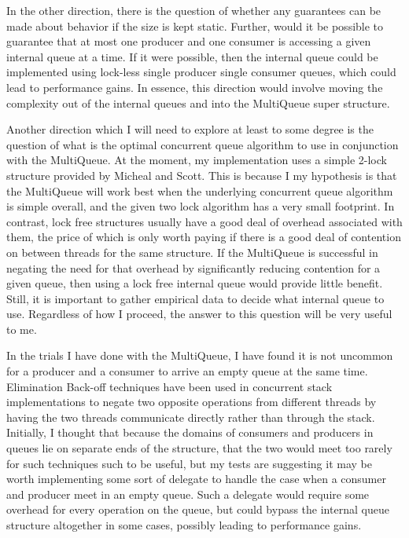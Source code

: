 \documentclass[12pt]{report}
\begin{document}
In the other direction, there is the question of whether any guarantees can be
made about behavior if the size is kept static. Further, would it be possible
to guarantee that at most one producer and one consumer is accessing a given
internal queue at a time. If it were possible, then the internal queue could be
implemented using lock-less single producer single consumer queues, which could
lead to performance gains. In essence, this direction would involve moving the
complexity out of the internal queues and into the MultiQueue super structure.

Another direction which I will need to explore at least to some degree is the
question of what is the optimal concurrent queue algorithm to use in
conjunction with the MultiQueue. At the moment, my implementation uses a simple
2-lock structure provided by Micheal and Scott\cite{michael1996}. This is
because I my hypothesis is that the MultiQueue will work best when the
underlying concurrent queue algorithm is simple overall, and the given two lock
algorithm has a very small footprint. In contrast, lock free structures usually
have a good deal of overhead associated with them, the price of which is only
worth paying if there is a good deal of contention on between threads for the
same structure. If the MultiQueue is successful in negating the need for that
overhead by significantly reducing contention for a given queue, then using a
lock free internal queue would provide little benefit. Still, it is important
to gather empirical data to decide what internal queue to use. Regardless of
how I proceed, the answer to this question will be very useful to me.

In the trials I have done with the MultiQueue, I have found it is not uncommon
for a producer and a consumer to arrive an empty queue at the same time.
Elimination Back-off techniques have been used in concurrent stack
implementations to negate two opposite operations from different threads by
having the two threads communicate directly rather than through the stack.
Initially, I thought that because the domains of consumers and producers in
queues lie on separate ends of the structure, that the two would meet too
rarely for such techniques such to be useful, but my tests are suggesting it
may be worth implementing some sort of delegate to handle the case when a
consumer and producer meet in an empty queue. Such a delegate would require
some overhead for every operation on the queue, but could bypass the internal
queue structure altogether in some cases, possibly leading to performance
gains.
\end{document}
